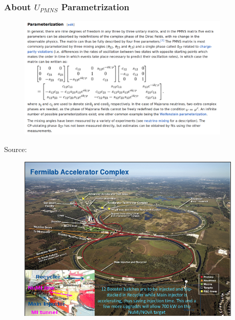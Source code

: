 \begin{frame}\frametitle{About $U_{PMNS}$ Parametrization}
\begin{figure}
\centering
\includegraphics[width=0.90\textwidth, keepaspectratio=true]{figs/U_PMNS_parametrization.png}
\end{figure}
\tiny Source: \cite{ref_U_parametrization}
\end{frame}

\begin{frame}
\begin{figure}
\label{fig:LBNF_FermilabAccComplex}
\centering
\includegraphics[width=0.95\textwidth, keepaspectratio=true]{figs/FermilabAccelerator.png}
\end{figure}
\end{frame}

